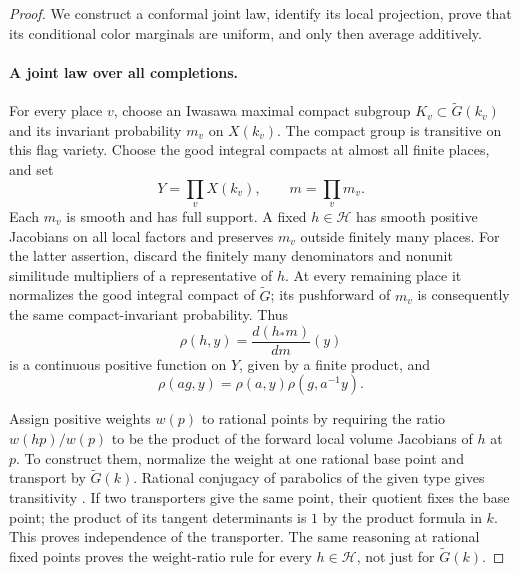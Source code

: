 \begin{proof}
We construct a conformal joint law, identify its local projection, prove
that its conditional color marginals are uniform, and only then average
additively.

\paragraph{A joint law over all completions.}
For every place $v$, choose an Iwasawa maximal compact subgroup
$K_v\subset\widetilde G(k_v)$ and its invariant probability $m_v$ on
$X(k_v)$. The compact group is transitive on this flag variety.
Choose the good integral compacts at almost all finite places, and set
\[
 Y=\prod_v X(k_v),\qquad m=\prod_v m_v.
\]
Each $m_v$ is smooth and has full support. A fixed $h\in\mathcal H$
has smooth positive Jacobians on all local factors and preserves $m_v$
outside finitely many places. For the latter assertion, discard the
finitely many denominators and nonunit similitude multipliers of a
representative of $h$. At every remaining place it normalizes the good
integral compact of $\widetilde G$; its pushforward of $m_v$ is consequently
the same compact-invariant probability. Thus
\[
 \rho(h,y)=\frac{d(h_*m)}{dm}(y)
\]
is a continuous positive function on $Y$, given by a finite product, and
\begin{equation}\label{eq:palette-cocycle}
 \rho(ag,y)=\rho(a,y)\rho(g,a^{-1}y).
\end{equation}

Assign positive weights $w(p)$ to rational points by requiring the ratio
$w(hp)/w(p)$ to be the product of the forward local volume Jacobians of
$h$ at $p$. To construct them, normalize the weight at one rational
base point and transport by $\widetilde G(k)$. Rational conjugacy of
parabolics of the given type gives transitivity
\cite[Theorem~4.13(a,c)]{BorelTits1965}. If two transporters
give the same point, their quotient fixes the base point; the product
of its tangent determinants is $1$ by the product formula in $k$.
This proves independence of the transporter. The same reasoning at
rational fixed points proves the weight-ratio rule for every
$h\in\mathcal H$, not just for $\widetilde G(k)$.


\end{proof}
